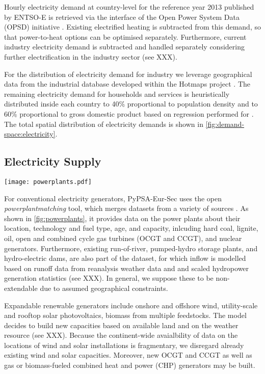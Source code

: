 Hourly electricity demand at country-level for the reference year 2013 published
by ENTSO-E is retrieved via the interface of the Open Power System Data (OPSD)
initiative \citeS{}. Existing electrified heating is subtracted from this
demand, so that power-to-heat options can be optimised separately. Furthermore,
current industry electricity demand is subtracted and handled separately
considering further electrification in the industry sector (see XXX).

For the distribution of electricity demand for industry we leverage geographical
data from the industrial database developed within the Hotmaps project \citeS{}.
The remaining electricity demand for households and services is heuristically
distributed inside each country to 40\% proportional to population density and
to 60\% proportional to gross domestic product based on regression performed for
. The total spatial distribution of electricity
demands is shown in \cref{fig:demand-space:electricity}.

\subsection{Electricity Supply}

\begin{SCfigure}
    \caption{Powerplants.}
    \label{fig:powerplants}
    \texttt{[image: powerplants.pdf]}
\end{SCfigure}

For conventional electricity generators, PyPSA-Eur-Sec uses the open
\textit{powerplantmatching} tool, which merges datasets from a variety of
sources . As shown in \cref{fig:powerplants}, it
provides data on the power plants about their location, technology and fuel
type, age, and capacity, inlcuding hard coal, lignite, oil, open and combined
cycle gas turbines (OCGT and CCGT), and nuclear generators. Furthermore,
existing run-of-river, pumped-hydro storage plants, and hydro-electric dams, are
also part of the dataset, for which inflow is modelled based on runoff data from
reanalysis weather data and and scaled hydropower generation statistics (see
XXX). In general, we suppose these to be non-extendable due to assumed
geographical constraints.

Expandable renewable generators include onshore and offshore wind, utility-scale
and rooftop solar photovoltaics, biomass from multiple feedstocks. The model
decides to build new capacities based on available land and on the weather
resource (see XXX). Because the continent-wide avaialbility of data on the
locations of wind and solar installations is fragmentary, we disregard already
existing wind and solar capacities. Moreover, new OCGT and CCGT as well as gas or biomass-fueled combined heat and power (CHP) generators may be built.

